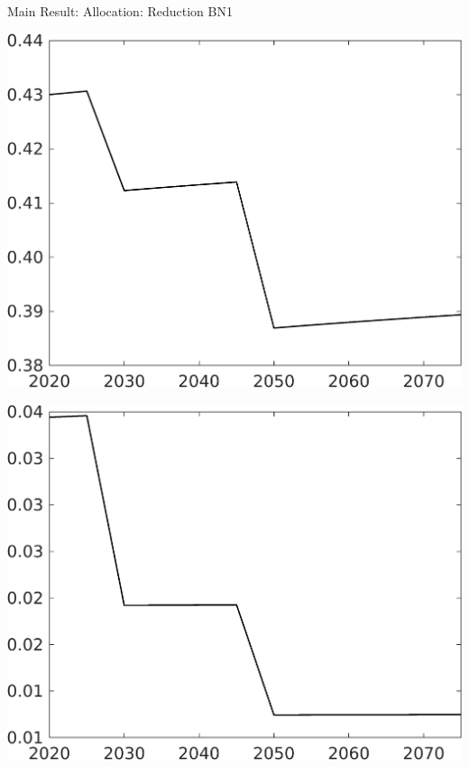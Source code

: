\documentclass[11pt,aspectratio=169]{beamer}
\begin{document}
\begin{frame}{Main Result: Allocation: Reduction BN1}
\begin{minipage}[]{0.32\textwidth}
	\end{minipage}
	\begin{minipage}[]{0.32\textwidth}
		\includegraphics[width=1\textwidth]{../codding_model/own_basedOnFried/optimalPol_elastS_DisuSci/figures/all_1705/Single_OPT_T_NoTaus_hl_spillover0_sep1_BN1_ineq0_red0_etaa0.79.png}
	\end{minipage}
	\begin{minipage}[]{0.32\textwidth}
		\includegraphics[width=1\textwidth]{../codding_model/own_basedOnFried/optimalPol_elastS_DisuSci/figures/all_1705/Single_OPT_T_NoTaus_sff_spillover0_sep1_BN1_ineq0_red0_etaa0.79.png}

\end{minipage}
\end{frame}
\end{document}
